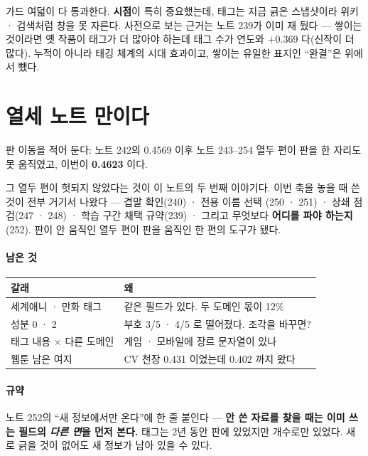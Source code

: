 \documentclass[10pt]{article}
\begin{document}
가드 여덟이 다 통과한다. \textbf{시점}이 특히 중요했는데, 태그는 지금 긁은
스냅샷이라 위키 · 검색처럼 창을 못 자른다. 사전으로 보는 근거는 노트 239가
이미 재 뒀다 --- 쌓이는 것이라면 옛 작품이 태그가 더 많아야 하는데 태그 수가
연도와 $+$0.369 다(신작이 더 많다). 누적이 아니라 태깅 체계의 시대 효과이고,
쌓이는 유일한 표지인 ``완결''은 위에서 뺐다.

\section{열세 노트 만이다}

판 이동을 적어 둔다: 노트 242의 0.4569 이후 노트 243--254 열두 편이 판을
한 자리도 못 움직였고, 이번이 \textbf{0.4623} 이다.

그 열두 편이 헛되지 않았다는 것이 이 노트의 두 번째 이야기다. 이번 축을
놓을 때 쓴 것이 전부 거기서 나왔다 --- 겹말 확인(240) · 전용 이름 선택
(250 · 251) · 상쇄 점검(247 · 248) · 학습 구간 채택 규약(239) · 그리고
무엇보다 \textbf{어디를 파야 하는지}(252). 판이 안 움직인 열두 편이 판을
움직인 한 편의 도구가 됐다.

\paragraph{남은 것}
\begin{center}\small
\begin{tabular}{ll}
\hline
갈래 & 왜 \\
\hline
세계애니 · 만화 태그 & 같은 필드가 있다. 두 도메인 몫이 12\% \\
성분 0 · 2 & 부호 3/5 · 4/5 로 떨어졌다. 조각을 바꾸면? \\
태그 내용 $\times$ 다른 도메인 & 게임 · 모바일에 장르 문자열이 있나 \\
웹툰 남은 여지 & CV 천장 0.431 이었는데 0.402 까지 왔다 \\
\hline
\end{tabular}
\end{center}

\paragraph{규약} 노트 252의 ``새 정보에서만 온다''에 한 줄 붙인다 ---
\textbf{안 쓴 자료를 찾을 때는 이미 쓰는 필드의 \emph{다른 면}을 먼저 본다.}
태그는 2년 동안 판에 있었지만 개수로만 있었다. 새로 긁을 것이 없어도
새 정보가 남아 있을 수 있다.
\end{document}
